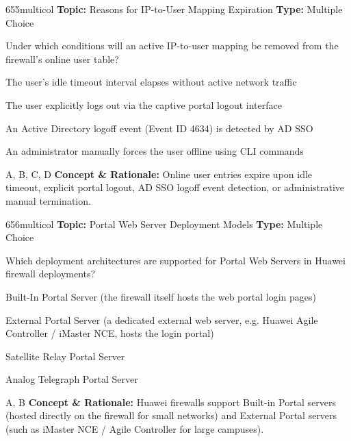 \begin{qcard}{655}{multicol}
\textcolor{darkslate!75}{\small\textbf{Topic:} Reasons for IP-to-User Mapping Expiration \hfill \textbf{Type:} Multiple Choice}\vspace{0.4em}\par
Under which conditions will an active IP-to-user mapping be removed from the firewall's online user table?
\begin{qoptions}
\item The user's idle timeout interval elapses without active network traffic
\item The user explicitly logs out via the captive portal logout interface
\item An Active Directory logoff event (Event ID 4634) is detected by AD SSO
\item An administrator manually forces the user offline using CLI commands
\end{qoptions}
\end{qcard}
\nopagebreak
\begin{explainbox}{A, B, C, D}
\textbf{Concept \& Rationale:} Online user entries expire upon idle timeout, explicit portal logout, AD SSO logoff event detection, or administrative manual termination.
\end{explainbox}

\begin{qcard}{656}{multicol}
\textcolor{darkslate!75}{\small\textbf{Topic:} Portal Web Server Deployment Models \hfill \textbf{Type:} Multiple Choice}\vspace{0.4em}\par
Which deployment architectures are supported for Portal Web Servers in Huawei firewall deployments?
\begin{qoptions}
\item Built-In Portal Server (the firewall itself hosts the web portal login pages)
\item External Portal Server (a dedicated external web server, e.g. Huawei Agile Controller / iMaster NCE, hosts the login portal)
\item Satellite Relay Portal Server
\item Analog Telegraph Portal Server
\end{qoptions}
\end{qcard}
\nopagebreak
\begin{explainbox}{A, B}
\textbf{Concept \& Rationale:} Huawei firewalls support Built-in Portal servers (hosted directly on the firewall for small networks) and External Portal servers (such as iMaster NCE / Agile Controller for large campuses).
\end{explainbox}

